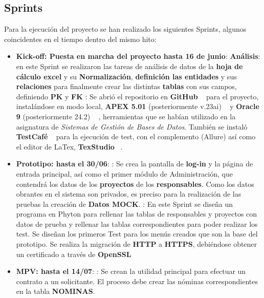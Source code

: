 \subsection{Sprints}
Para la ejecución del proyecto se han realizado los siguientes \gls{Sprint}s, algunos coincidentes en el tiempo dentro del mismo hito:
\begin{itemize}
	\item \textbf{Kick-off: Puesta en marcha del proyecto hasta 16 de junio}:
	\subitem \textbf{Análisis}: en este \gls{Sprint} se realizaron las tareas de análisis de datos de la \textbf{hoja de cálculo excel} y su \textbf{\gls{Normalización}}, \textbf{definición las entidades} y sus \textbf{relaciones} para finalmente crear las distintas \textbf{tablas} con sus campos, definiendo \textbf{\acrshort{PK}} y \textbf{\acrshort{FK}} 
	: Se abrió el repositorio en \textbf{GitHub} ~\cite{ChaconProGitTodo} para el proyecto, instalándose en modo local, \textbf{\acrshort{APEX} 5.01} (posteriormente v.23ai) ~\cite{DattaInstallingOracleDatabasea} y \textbf{Oracle 9} (posteriormente 24.2) ~\cite{JenningsInstallingConfiguringAPEX} , herramientas que se habían utilizado en la asignatura de \textit{Sistemas de Gestión de Bases de Datos}. También se instaló \textbf{TestCafé} ~\cite{TestCodeGuide} para la ejecución de test, con el complemento (Allure) así como el editor de LaTex, \textbf{TexStudio} ~\cite{BibliotecaComplutenseLaTeXTuTFG2024}.
	\item{\textbf{Prototipo: hasta el 30/06}}:
	: Se crea la pantalla de \textbf{log-in} y la página de entrada principal, así como el primer módulo de Administración, que contendrá los datos de los \textbf{proyectos} de los \textbf{responsables}. Como los datos obrantes en el sistema son privados, es preciso para la realización de las pruebas la creación de \textbf{\gls{Datos MOCK}}.
	: En este \gls{Sprint} se diseña un programa en Phyton para rellenar las tablas de responsables y proyectos con datos de prueba y rellenar las tablas correspondientes para poder realizar los test. Se diseñan los primeros Test para los menús creados que son la base del prototipo. Se realiza la migración de \textbf{HTTP} a \textbf{\acrshort{HTTPS}}, debiéndose obtener un certificado a través de \textbf{OpenSSL}
	\item{\textbf{MPV: hasta el 14/07}}: 
	: Se crean la utilidad principal para efectuar un contrato a un solicitante. El proceso debe crear las nóminas correspondientes en la tabla \textbf{NOMINAS}.

\end{itemize}
